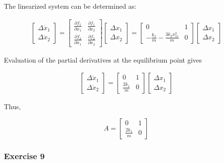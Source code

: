 The linearized system can be determined as:

\begin{eqnarray}
\begin{bmatrix}
 \Delta \dot{x}_1\\
 \Delta \dot{x}_2
\end{bmatrix}= 
\begin{bmatrix}
 \frac{\partial f_1}{\partial x_1} & \frac{\partial f_1}{\partial x_2}   \\
 \frac{\partial f_2}{\partial x_1} & \frac{\partial f_2}{\partial x_2} 
\end{bmatrix}
\begin{bmatrix}
 \Delta x_1  \\
 \Delta x_2  
\end{bmatrix}=
\begin{bmatrix}
 0 & 1   \\
 -\frac{k_1}{m}-\frac{3k_2 x_{1e}^{2}}{m} & 0  
\end{bmatrix}
\begin{bmatrix}
 \Delta x_1  \\
 \Delta x_2  
\end{bmatrix} \nonumber
\end{eqnarray}

Evaluation of the partial derivatives at the equilibrium point gives

\begin{eqnarray}
\begin{bmatrix}
 \Delta \dot{x}_1\\
 \Delta \dot{x}_2
\end{bmatrix}= 
\begin{bmatrix}
 0 & 1   \\
 \frac{2k_1}{m} & 0 
\end{bmatrix}
\begin{bmatrix}
 \Delta x_1  \\
 \Delta x_2  
\end{bmatrix} \nonumber
\end{eqnarray}

Thus,

\begin{equation}
A = 
\begin{bmatrix}
 0 & 1   \\
 \frac{2k_1}{m} & 0 
\end{bmatrix}
\nonumber
\end{equation}

\subsubsection{Exercise 9}


